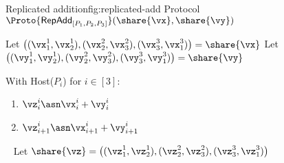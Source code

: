 \begin{Boxfig}{Replicated addition}{fig:replicated-add}
  {Protocol $\Proto{\mathsf{RepAdd}_{[P_1, P_2, P_3]}}(\share{\vx}, \share{\vy})$}
  
  Let $\big((\vx_1^1, \vx_2^1), (\vx_2^2, \vx_3^2), (\vx_3^3, \vx_1^3) \big) = \share{\vx}$ \newline
  Let $\big((\vy_1^1, \vy_2^1), (\vy_2^2, \vy_3^2), (\vy_3^3, \vy_1^3) \big) = \share{\vy}$ \newline
  
  With Host($P_i$) for $i \in [3]$:
  \begin{enumerate}
    \item $\vz_i^i \asn \vx_i^i + \vy_i^i$
    \item $\vz_{i+1}^i \asn \vx_{i+1}^i + \vy_{i+1}^i$
  \end{enumerate}
  ~\newline
  Let $\share{\vz} = \big((\vz_1^1, \vz_2^1), (\vz_2^2, \vz_3^2), (\vz_3^3, \vz_1^3) \big)$
\end{Boxfig}








